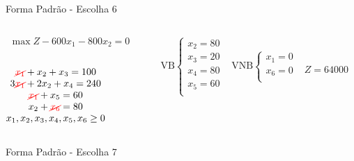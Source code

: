 \documentclass{beamer}
\begin{document}
\begin{frame}
{\begin{block}{Forma Padrão - {\color{cyan}Escolha 6}}
			\begin{columns}
				\begin{column}{0.35\textwidth}
					$
						\begin{matrix}
							\max Z - 600x_1 - 800x_2 = 0 \\
						\end{matrix}
					$ \\
					 \\
					$
						\begin{matrix}
							{\color{red}\cancel{x_1}}  + x_2  + x_3                   = 100 \\
							3{\color{red}\cancel{x_1}} + 2x_2       + x_4             = 240 \\
							{\color{red}\cancel{x_1}}                     + x_5       = 60 \\
							x_2                           + {\color{red}\cancel{x_6}} = 80 \\
							x_1,x_2, x_3, x_4, x_5, x_6 \ge 0 \\
						\end{matrix}
					$
				\end{column}
				\vline
				\hspace{0.1cm}
				\begin{column}{0.45\textwidth}
						$
							\begin{matrix}
								\text{VB} \left\{  \begin{matrix}
																 x_2 = 80 \\
																 x_3 = 20 \\
																 x_4 = 80 \\
																 x_5 = 60 \\
												   \end{matrix} 
										   \right.
								&
								\text{VNB} \left\{  \begin{matrix}
																 x_1 = 0 \\
																 x_6 = 0 \\
												   \end{matrix} 
										   \right. 
								\\
							 & \\
							\end{matrix}
						$
						{\color{red}$ Z = 64000 $}
				\end{column}
			\end{columns}
		\end{block}
	}
	{
		\begin{block}{Forma Padrão - {\color{cyan}Escolha 7}}

\end{block}}
\end{frame}
\end{document}
